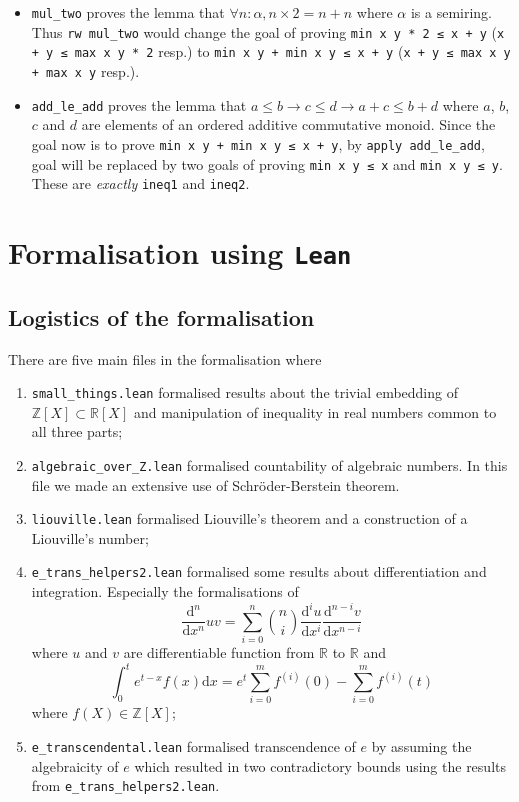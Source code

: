 \documentclass{report}
\theoremstyle{definition}
\theoremstyle{plain}
\begin{document}
\begin{itemize}
  \item {\tt \small mul\_two} proves the lemma that $\forall n:\alpha, n\times 2 = n+n$ where $\alpha$ is a semiring. Thus {\tt \small rw mul\_two} would change the goal of proving {\tt \small min x y * 2 ≤ x + y} ({\tt \small x + y ≤ max x y * 2} resp.) to {\tt \small min x y + min x y ≤ x + y} ({\tt \small x + y ≤ max x y + max x y} resp.).
  \item {\tt \small add\_le\_add} proves the lemma that $a \le b \to c \le d \to a + c \le b + d$ where $a$, $b$, $c$ and $d$ are elements of an ordered additive commutative monoid. Since the goal now is to prove {\tt \small min x y + min x y ≤ x + y}, by {\tt \small apply add\_le\_add}, goal will be replaced by two goals of proving {\tt \small min x y ≤ x} and {\tt \small min x y ≤ y}. These are {\it exactly} {\tt \small ineq1} and {\tt \small ineq2}.
\end{itemize}

\chapter{Formalisation using {\tt Lean}}\label{fmlsn}
\section*{Logistics of the formalisation}
There are five main files in the formalisation where 
\begin{enumerate}
\item {\tt \small small\_things.lean} formalised results about the trivial embedding of $\mathbb Z[X]\subset \mathbb R[X]$ and manipulation of inequality in real numbers common to all three parts;
\item {\tt \small algebraic\_over\_Z.lean} formalised countability of algebraic numbers. In this file we made an extensive use of Schröder-Berstein theorem.
\item {\tt \small liouville.lean} formalised Liouville's theorem and a construction of a Liouville's number;
\item {\tt \small e\_trans\_helpers2.lean} formalised some results about differentiation and integration. Especially the formalisations of 
$$
\frac{\mathrm d^n}{\mathrm d x^n}uv = \sum_{i=0}^n{n \choose i}\frac{\mathrm d^i u}{\mathrm d x^i}\frac{\mathrm d^{n-i} v}{\mathrm d x^{n-i}}
$$ where $u$ and $v$ are differentiable function from $\mathbb R$ to $\mathbb R$ and
$$
\int_0^t e^{t-x}f(x)\mathrm{d}x=e^t\sum_{i=0}^m f^{(i)}(0)-\sum_{i=0}^m f^{(i)}(t)
$$ where $f(X)\in\mathbb Z[X]$;
\item {\tt \small e\_transcendental.lean} formalised transcendence of $e$ by assuming the algebraicity of $e$ which resulted in two contradictory bounds using the results from {\tt \small e\_trans\_helpers2.lean}.
\end{enumerate}
\end{document}
